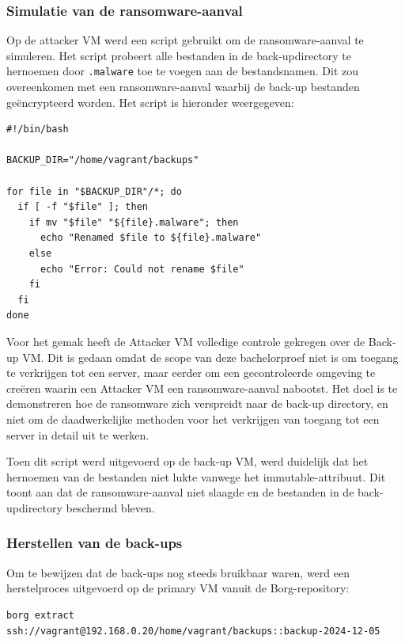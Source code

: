 \subsubsection{Simulatie van de ransomware-aanval}
Op de attacker VM werd een script gebruikt om de ransomware-aanval te simuleren. Het script probeert alle bestanden in de back-updirectory te hernoemen door \texttt{.malware} toe te voegen aan de bestandsnamen. Dit zou overeenkomen met een ransomware-aanval waarbij de back-up bestanden geëncrypteerd worden. Het script is hieronder weergegeven:
\begin{lstlisting}[language=script, caption={Bash script om een ransomware-aanval na te bootsen}]
#!/bin/bash
    
BACKUP_DIR="/home/vagrant/backups"
    
for file in "$BACKUP_DIR"/*; do
  if [ -f "$file" ]; then
    if mv "$file" "${file}.malware"; then
      echo "Renamed $file to ${file}.malware"
    else      
      echo "Error: Could not rename $file"    
    fi    
  fi    
done    
\end{lstlisting}
Voor het gemak heeft de Attacker VM volledige controle gekregen over de Back-up VM. Dit is gedaan omdat de scope van deze bachelorproef niet is om toegang te verkrijgen tot een server, maar eerder om een gecontroleerde omgeving te creëren waarin een Attacker VM een ransomware-aanval nabootst. Het doel is te demonstreren hoe de ransomware zich verspreidt naar de back-up directory, en niet om de daadwerkelijke methoden voor het verkrijgen van toegang tot een server in detail uit te werken.

Toen dit script werd uitgevoerd op de back-up VM, werd duidelijk dat het hernoemen van de bestanden niet lukte vanwege het immutable-attribuut. Dit toont aan dat de ransomware-aanval niet slaagde en de bestanden in de back-updirectory beschermd bleven.

\subsubsection{Herstellen van de back-ups}
Om te bewijzen dat de back-ups nog steeds bruikbaar waren, werd een herstelproces uitgevoerd op de primary VM vanuit de Borg-repository:
\begin{lstlisting}[language=script, caption={Borg commando om een back-up te herstellen}]
borg extract 
ssh://vagrant@192.168.0.20/home/vagrant/backups::backup-2024-12-05
\end{lstlisting}

